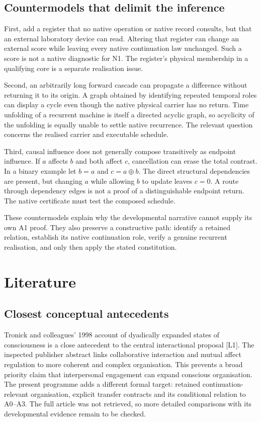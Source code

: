 \documentclass[
  11pt,
  a4paper,
]{article}
\begin{document}
\subsection{Countermodels that delimit the
inference}\label{countermodels-that-delimit-the-inference}

First, add a register that no native operation or native record
consults, but that an external laboratory device can read. Altering that
register can change an external score while leaving every native
continuation law unchanged. Such a score is not a native diagnostic for
N1. The register's physical membership in a qualifying core is a
separate realisation issue.

Second, an arbitrarily long forward cascade can propagate a difference
without returning it to its origin. A graph obtained by identifying
repeated temporal roles can display a cycle even though the native
physical carrier has no return. Time unfolding of a recurrent machine is
itself a directed acyclic graph, so acyclicity of the unfolding is
equally unable to settle native recurrence. The relevant question
concerns the realised carrier and executable schedule.

Third, causal influence does not generally compose transitively as
endpoint influence. If \(a\) affects \(b\) and both affect \(c\),
cancellation can erase the total contrast. In a binary example let
\(b=a\) and \(c=a\oplus b\). The direct structural dependencies are
present, but changing \(a\) while allowing \(b\) to update leaves
\(c=0\). A route through dependency edges is not a proof of a
distinguishable endpoint return. The native certificate must test the
composed schedule.

These countermodels explain why the developmental narrative cannot
supply its own A1 proof. They also preserve a constructive path:
identify a retained relation, establish its native continuation role,
verify a genuine recurrent realisation, and only then apply the stated
constitution.

\section{Literature}\label{literature}

\subsection{Closest conceptual
antecedents}\label{closest-conceptual-antecedents}

Tronick and colleagues' 1998 account of dyadically expanded states of
consciousness is a close antecedent to the central interactional
proposal {[}L1{]}. The inspected publisher abstract links collaborative
interaction and mutual affect regulation to more coherent and complex
organisation. This prevents a broad priority claim that interpersonal
engagement can expand conscious organisation. The present programme adds
a different formal target: retained continuation-relevant organisation,
explicit transfer contracts and its conditional relation to A0--A3. The
full article was not retrieved, so more detailed comparisons with its
developmental evidence remain to be checked.
\end{document}
